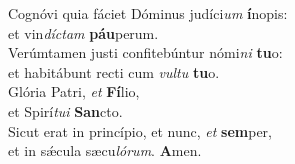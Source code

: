 \oddverse Cognóvi quia fáciet Dóminus judíci\textit{um} \textbf{í}nopis:~\*\\
\oddverse et vin\textit{dí}\textit{ctam} \textbf{páu}perum.\\
\evenverse Verúmtamen justi confitebúntur nómi\textit{ni} \textbf{tu}o:~\*\\
\evenverse et habitábunt recti cum \textit{vul}\textit{tu} \textbf{tu}o.\\
\oddverse Glória Patri, \textit{et} \textbf{Fí}lio,~\*\\
\oddverse et Spirí\textit{tu}\textit{i} \textbf{San}cto.\\
\evenverse Sicut erat in princípio, et nunc, \textit{et} \textbf{sem}per,~\*\\
\evenverse et in sǽcula sæcu\textit{ló}\textit{rum}. \textbf{A}men.\\
